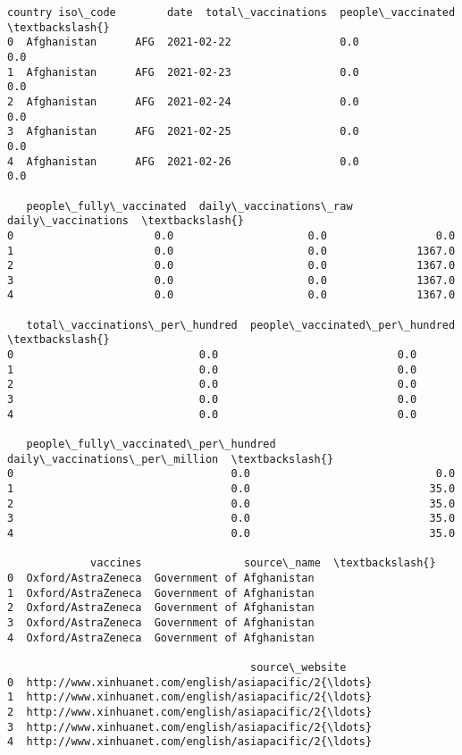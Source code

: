 \documentclass[11pt]{article}
\makeatletter
\newcommand{\boxspacing}{\kern\kvtcb@left@rule\kern\kvtcb@boxsep}
\newcommand{\prompt}[4]{
        {\ttfamily\llap{{\color{#2}[#3]:\hspace{3pt}#4}}\vspace{-\baselineskip}}
    }
\makeatother
\begin{document}
            \begin{tcolorbox}[breakable, size=fbox, boxrule=.5pt, pad at break*=1mm, opacityfill=0]
\prompt{Out}{outcolor}{25}{\boxspacing}
\begin{Verbatim}[commandchars=\\\{\}]
       country iso\_code        date  total\_vaccinations  people\_vaccinated  \textbackslash{}
0  Afghanistan      AFG  2021-02-22                 0.0                0.0
1  Afghanistan      AFG  2021-02-23                 0.0                0.0
2  Afghanistan      AFG  2021-02-24                 0.0                0.0
3  Afghanistan      AFG  2021-02-25                 0.0                0.0
4  Afghanistan      AFG  2021-02-26                 0.0                0.0

   people\_fully\_vaccinated  daily\_vaccinations\_raw  daily\_vaccinations  \textbackslash{}
0                      0.0                     0.0                 0.0
1                      0.0                     0.0              1367.0
2                      0.0                     0.0              1367.0
3                      0.0                     0.0              1367.0
4                      0.0                     0.0              1367.0

   total\_vaccinations\_per\_hundred  people\_vaccinated\_per\_hundred  \textbackslash{}
0                             0.0                            0.0
1                             0.0                            0.0
2                             0.0                            0.0
3                             0.0                            0.0
4                             0.0                            0.0

   people\_fully\_vaccinated\_per\_hundred  daily\_vaccinations\_per\_million  \textbackslash{}
0                                  0.0                             0.0
1                                  0.0                            35.0
2                                  0.0                            35.0
3                                  0.0                            35.0
4                                  0.0                            35.0

             vaccines                source\_name  \textbackslash{}
0  Oxford/AstraZeneca  Government of Afghanistan
1  Oxford/AstraZeneca  Government of Afghanistan
2  Oxford/AstraZeneca  Government of Afghanistan
3  Oxford/AstraZeneca  Government of Afghanistan
4  Oxford/AstraZeneca  Government of Afghanistan

                                      source\_website
0  http://www.xinhuanet.com/english/asiapacific/2{\ldots}
1  http://www.xinhuanet.com/english/asiapacific/2{\ldots}
2  http://www.xinhuanet.com/english/asiapacific/2{\ldots}
3  http://www.xinhuanet.com/english/asiapacific/2{\ldots}
4  http://www.xinhuanet.com/english/asiapacific/2{\ldots}
\end{Verbatim}
\end{tcolorbox}
        
\end{document}
